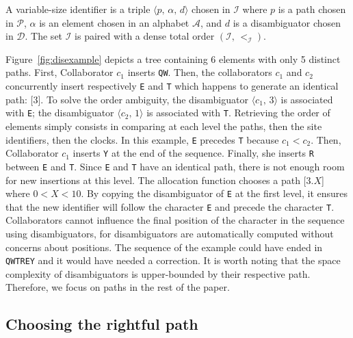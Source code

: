 \begin{definition}
  A variable-size identifier is a triple $\langle p,\, \alpha,\, d \rangle$
  chosen in $\mathcal{I}$ where $p$ is a path chosen in $\mathcal{P}$, $\alpha$
  is an element chosen in an alphabet $\mathcal{A}$, and $d$ is a disambiguator
  chosen in $\mathcal{D}$. The set $\mathcal{I}$ is paired with a dense total
  order $(\mathcal{I},\,<_\mathcal{I})$.
\end{definition}

Figure~\ref{fig:disexample} depicts a tree containing 6 elements with only 5
distinct paths. First, Collaborator $c_1$ inserts \texttt{QW}.  Then, the
collaborators $c_1$ and $c_2$ concurrently insert respectively \texttt{E} and
\texttt{T} which happens to generate an identical path: [$3$]. To solve the
order ambiguity, the disambiguator $\langle c_1,\, 3\rangle$ is associated with
\texttt{E}; the disambiguator $\langle c_2,\, 1\rangle$ is associated with
\texttt{T}. Retrieving the order of elements simply consists in comparing at
each level the paths, then the site identifiers, then the clocks. In this
example, \texttt{E} precedes \texttt{T} because $c_1 < c_2$. Then, Collaborator
$c_1$ inserts \texttt{Y} at the end of the sequence. Finally, she inserts
\texttt{R} between \texttt{E} and \texttt{T}. Since \texttt{E} and \texttt{T}
have an identical path, there is not enough room for new insertions at this
level. The allocation function chooses a path [$3.X$] where $0<X<10$. By copying
the disambiguator of \texttt{E} at the first level, it ensures that the new
identifier will follow the character \texttt{E} and precede the character
\texttt{T}.  Collaborators cannot influence the final position of the character
in the sequence using disambiguators, for disambiguators are automatically
computed without concerns about positions. The sequence of the example could
have ended in \texttt{QWTREY} and it would have needed a correction. It is worth
noting that the space complexity of disambiguators is upper-bounded by their
respective path. Therefore, we focus on paths in the rest of the paper.

\subsection{Choosing the rightful path}
\label{subsec:choosing}

